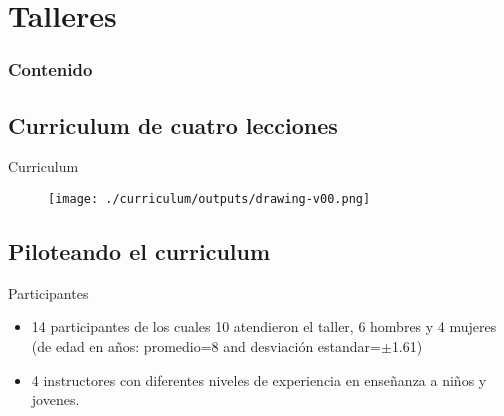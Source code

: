 \section{Talleres}

\begin{frame}
      \frametitle{Contenido}
      \tableofcontents[currentsection]
\end{frame}


\subsection{
Curriculum de cuatro lecciones
}

{

\begin{frame}{Curriculum}
      \begin{figure}
        \centering
        \texttt{[image: ./curriculum/outputs/drawing-v00.png]}
      \end{figure}
\end{frame}
}


\subsection{
Piloteando el curriculum
}

{

\begin{frame}{Participantes}

\begin{itemize}
\item 14 participantes de los cuales 10 atendieron el taller, 6 hombres y 4 mujeres (de edad en a\~nos: promedio=8 and desviaci\'on estandar=$\pm$1.61)     
\item 4 instructores con diferentes niveles de experiencia en ense\~nanza a ni\~nos y jovenes.
\end{itemize}

\end{frame}
}




